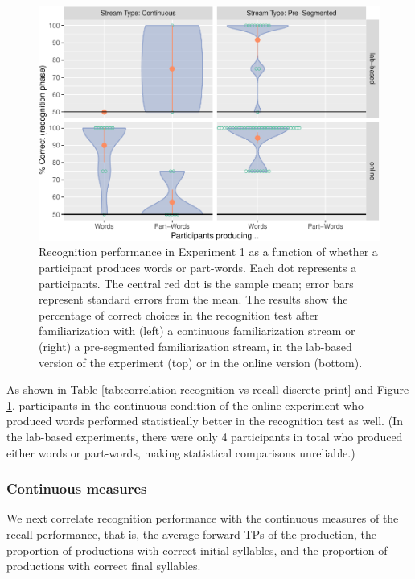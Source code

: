 \documentclass[
]{article}
\begin{document}
\begin{figure}

{\centering \includegraphics[width=0.8\linewidth]{segmentation_recall_combined_for_revision4_files/figure-latex/correlation-recognition-vs-recall-discrete-plot-1} 

}

\caption{Recognition performance in Experiment 1 as a function of whether a participant produces words or part-words. Each dot represents a participants. The central red dot is the sample mean; error bars represent standard errors from the mean. The results show the percentage of correct choices in the recognition test after familiarization with (left) a continuous familiarization stream or (right) a pre-segmented familiarization stream, in the lab-based version of the experiment (top) or in the online version (bottom).}\label{fig:correlation-recognition-vs-recall-discrete-plot}
\end{figure}

As shown in Table
\ref{tab:correlation-recognition-vs-recall-discrete-print} and Figure
\ref{fig:correlation-recognition-vs-recall-discrete-plot}, participants
in the continuous condition of the online experiment who produced words
performed statistically better in the recognition test as well. (In the
lab-based experiments, there were only 4 participants in total who
produced either words or part-words, making statistical comparisons
unreliable.)

\subsubsection{Continuous measures}\label{continuous-measures}

We next correlate recognition performance with the continuous measures
of the recall performance, that is, the average forward TPs of the
production, the proportion of productions with correct initial
syllables, and the proportion of productions with correct final
syllables.
\end{document}
